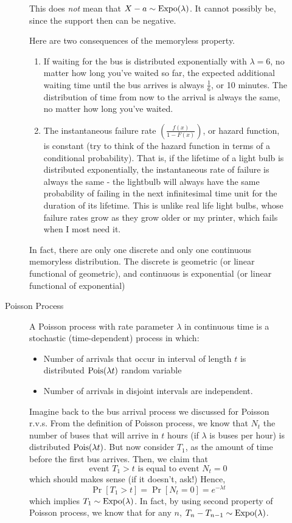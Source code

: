 \documentclass[11pt]{article}
\theoremstyle{definition}
\theoremstyle{remark}
\newcommand{\Expo}{\textnormal{Expo}}
\newcommand{\Pois}{\textnormal{Pois}}
\begin{document}
\begin{description}
\begin{description}
 	\Biohazard This does \textit{not} mean that $X - a \sim \Expo(\lambda)$. It cannot possibly be, since the support then can be negative. 
 	
	Here are two consequences of the memoryless property.
	\begin{enumerate}
		\item If waiting for the bus is distributed exponentially with $\lambda = 6$, no matter how long you've waited so far, the expected additional waiting time until the bus arrives is always $\frac{1}{6}$, or 10 minutes. The distribution of time from now to the arrival is always the same, no matter how long you've waited.
		\item The instantaneous failure rate $\left(\frac{f(x)}{1-F(x)}\right)$, or hazard function, is constant (try to think of the hazard function in terms of a conditional probability). That is, if the lifetime of a light bulb is distributed exponentially, the instantaneous rate of failure is always the same - the lightbulb will always have the same probability of failing in the next infinitesimal time unit for the duration of its lifetime. This is unlike real life light bulbs, whose failure rates grow as they grow older or my printer, which fails when I most need it.
	\end{enumerate}
	
	In fact, there are only one discrete and only one continuous memoryless distribution. The discrete is geometric (or linear functional of geometric), and continuous is exponential (or linear functional of exponential) 
	
	\pagebreak
	
	\item [Poisson Process] A Poisson process with rate parameter $\lambda$ in continuous time is a stochastic (time-dependent) process in which:
	\begin{itemize}
	    \item Number of arrivals that occur in interval of length $t$ is distributed $\Pois(\lambda t)$ random variable
	    \item Number of arrivals in disjoint intervals are independent.
	\end{itemize}
    Imagine back to the bus arrival process we discussed for Poisson r.v.s. From the definition of Poisson process, we know that $N_t$ the number of buses that will arrive in $t$ hours (if $\lambda$ is buses per hour) is distributed $\Pois(\lambda t)$. But now consider $T_1$, as the amount of time before the first bus arrives. Then, we claim that $$\text{event } T_1 > t \text{ is equal to event } N_t = 0 $$ which should makes sense (if it doesn't, ask!) Hence, $$ \Pr[T_1 > t] = \Pr[N_t = 0] = e^{-\lambda t} $$ which implies $T_1 \sim \Expo(\lambda)$. In fact, by using second property of Poisson process, we know that for any $n$, $T_n - T_{n-1} \sim \Expo(\lambda)$.
    

\end{description}
\end{description}
\end{document}
